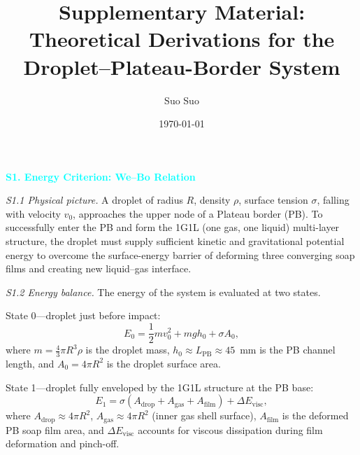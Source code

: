 \documentclass[%
 preprint,
 superscriptaddress,
 amsmath,amssymb,
 aps, prl,
]{revtex4-2}
\begin{document}

\title{Supplementary Material:\\
Theoretical Derivations for the Droplet--Plateau-Border System}

\author{Suo Suo}

\date{\today}

\maketitle

\textcolor{cyan}{\textbf{S1. Energy Criterion: We--Bo Relation}}\par

{\noindent\textit{S1.1 Physical picture.}}
A droplet of radius $R$, density $\rho$, surface tension $\sigma$, falling with velocity $v_0$, approaches the upper node of a Plateau border (PB).
To successfully enter the PB and form the 1G1L (one gas, one liquid) multi-layer structure, the droplet must supply sufficient kinetic and gravitational potential energy to overcome the surface-energy barrier of deforming three converging soap films and creating new liquid--gas interface.\par

{\noindent\textit{S1.2 Energy balance.}}
The energy of the system is evaluated at two states.\par

State 0---droplet just before impact:
\begin{equation}
E_0 = \frac{1}{2} m v_0^2 + m g h_0 + \sigma A_0,
\label{eq:s1_e0}
\end{equation}
where $m = \frac{4}{3}\pi R^3\rho$ is the droplet mass, $h_0 \approx L_{\text{PB}} \approx 45$~mm is the PB channel length, and $A_0 = 4\pi R^2$ is the droplet surface area.\par

State 1---droplet fully enveloped by the 1G1L structure at the PB base:
\begin{equation}
E_1 = \sigma (A_{\text{drop}} + A_{\text{gas}} + A_{\text{film}}) + \Delta E_{\text{visc}},
\label{eq:s1_e1}
\end{equation}
where $A_{\text{drop}} \approx 4\pi R^2$, $A_{\text{gas}} \approx 4\pi R^2$ (inner gas shell surface), $A_{\text{film}}$ is the deformed PB soap film area, and $\Delta E_{\text{visc}}$ accounts for viscous dissipation during film deformation and pinch-off.\par
\end{document}
